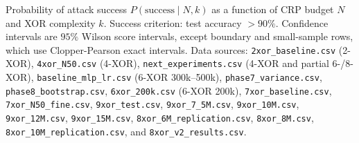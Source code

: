 \tablefloatbegin
\centering
\caption{Probability of attack success $P(\text{success} \mid N, k)$ as a
function of CRP budget $N$ and XOR complexity $k$.  Success criterion: test
accuracy $> 90\%$.  Confidence intervals are $95\%$ Wilson score intervals,
except boundary and small-sample rows, which use Clopper-Pearson exact
intervals.
Data sources: \texttt{2xor\_baseline.csv} (2-XOR),
\texttt{4xor\_N50.csv} (4-XOR),
\texttt{next\_experiments.csv} (4-XOR and partial 6-/8-XOR),
\texttt{baseline\_mlp\_lr.csv} (6-XOR 300k--500k),
\texttt{phase7\_variance.csv}, \texttt{phase8\_bootstrap.csv},
\texttt{6xor\_200k.csv} (6-XOR 200k),
\texttt{7xor\_baseline.csv}, \texttt{7xor\_N50\_fine.csv},
\texttt{9xor\_test.csv}, \texttt{9xor\_7\_5M.csv},
\texttt{9xor\_10M.csv}, \texttt{9xor\_12M.csv},
\texttt{9xor\_15M.csv},
\texttt{8xor\_6M\_replication.csv},
\texttt{8xor\_8M.csv},
\texttt{8xor\_10M\_replication.csv}, and
\texttt{8xor\_v2\_results.csv}.}
\label{tab:success_prob}
